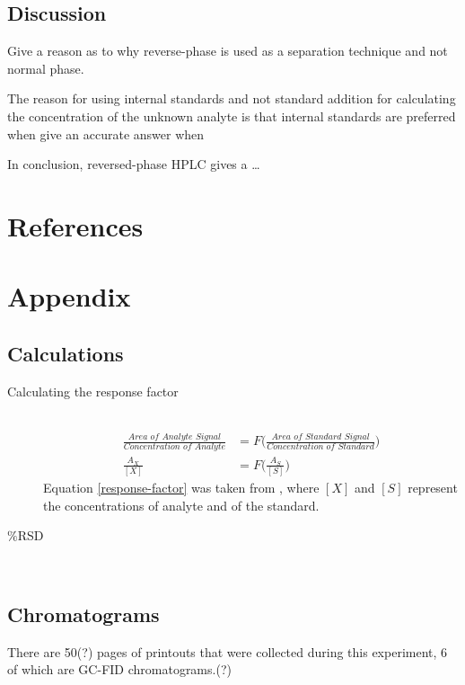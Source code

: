 \documentclass[a4paper, 12pt]{article}
\begin{document}
\subsection{Discussion}
Give a reason as to why reverse-phase is used as a separation technique and not normal phase.

The reason for using internal standards and not standard addition for calculating the concentration of the unknown analyte is that internal standards are preferred when give an accurate answer when 

In conclusion, reversed-phase HPLC gives a \dots


\section{References}
\printbibliography


\section{Appendix}

\subsection{Calculations}

\begin{description}
	\item[Calculating the response factor] \hfill \\
		\begin{equation} \label{response-factor}
		\begin{split}
			\frac{\textit{Area of Analyte Signal}}{\textit{Concentration of Analyte}} & = F\Bigg(\frac{\textit{Area of Standard Signal}}{\textit{Concentration of Standard}}\Bigg) \\
			\frac{A_X}{[X]} & = F\Bigg(\frac{A_S}{[S]}\Bigg)
		\end{split}
		\end{equation}
			Equation \ref{response-factor} was taken from \cite{harris}, where $[X]$ and $[S]$ represent the concentrations of analyte and of the standard.

	\item[$\%$RSD] \hfill \\
\end{description}

\subsection{Chromatograms}
There are 50(?) pages of printouts that were collected during this experiment, 6 of which are GC-FID chromatograms.(?)


\end{document}
